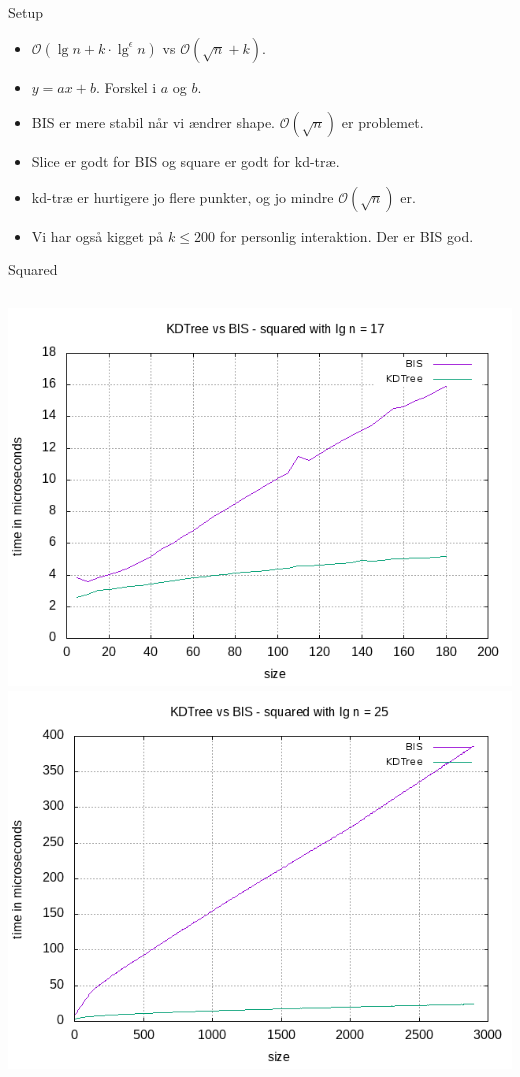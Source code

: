 \documentclass[pdf]{beamer}
\begin{document}
\begin{frame}{Setup}
      \begin{itemize}
        \item $\mathcal{O}(\lg n + k\cdot\lg^\epsilon n)$ vs $\mathcal{O}(\sqrt{n} + k)$.
        \item $y = ax + b$. Forskel i $a$ og $b$.
        \item BIS er mere stabil når vi ændrer shape. $\mathcal{O}(\sqrt{n})$ er problemet.
        \item Slice er godt for BIS og square er godt for kd-træ.
        \item kd-træ er hurtigere jo flere punkter, og jo mindre $\mathcal{O}(\sqrt{n})$ er.
        \item Vi har også kigget på $k \leq 200$ for personlig interaktion. Der er BIS god.
      \end{itemize}
\end{frame}

\begin{frame}{Squared}
  \begin{columns}
    \includegraphics[scale=0.32]{pictures/analysis/sqrt_17.png}
    \includegraphics[scale=0.32]{pictures/analysis/sqrt_25.png}
  \end{columns}
\end{frame}
\end{document}

